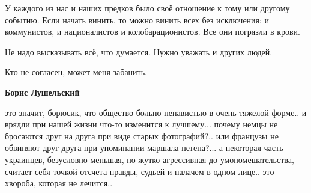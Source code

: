 \begin{itemize}
У каждого из нас и наших предков было своё отношение к тому или другому
событию. Если начать винить, то можно винить всех без исключения: и
коммунистов, и националистов и колобарационистов. Все они погрязли в крови.

Не надо высказывать всё, что думается. Нужно уважать и других людей.

Кто не согласен, может меня забанить.

\begin{itemize} %
\textbf{Борис Лушельский} 

это значит, борюсик, что общество больно ненавистью в очень тяжелой форме.. и
врядли при нашей жизни что-то изменится к лучшему... почему немцы не бросаются
друг на друга при виде старых фотографий?.. или французы не обвиняют друг друга
при упоминании маршала петена?... а некоторая часть украинцев, безусловно
меньшая, но жутко агрессивная до умопомешательства, считает себя точкой
отсчета правды, судьей и палачем в одном лице.. это хвороба, которая не
лечится..

\end{itemize} %


\end{itemize} %

